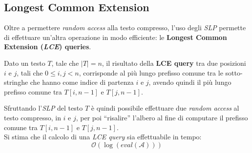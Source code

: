 \subsection{Longest Common Extension}
Oltre a permettere \textit{random access} alla testo compresso, 
l'uso degli \textit{SLP} permette di effettuare 
un'altra operazione in modo efficiente: le \textbf{Longest Common Extension
  (\textit{LCE}) queries}.
\begin{definizione}
  Dato un testo $T$, tale che $|T|=n$, il risultato della \textbf{LCE query} tra
  due posizioni $i$ e $j$, tali che $0\leq i,j<n$, corrisponde al più lungo
  prefisso comune tra le sotto-stringhe che hanno come indice di partenza $i$ e
  $j$, avendo quindi il più lungo prefisso comune tra $T[i,n-1]$ e $T[j,n-1]$.
\end{definizione}
Sfruttando l'\textit{SLP} del testo $T$ è quindi possibile effettuare due
\textit{random access} al testo compresso, in $i$ e $j$, per poi ``risalire''
l'albero al fine di computare il prefisso comune tra $T[i,n-1]$ e
$T[j,n-1]$.\\
Si stima che il calcolo di una \textit{LCE query} sia
effettuabile in tempo:
\[\mathcal{O}\left(\log (eval(\mathcal{A}))\right)\]
